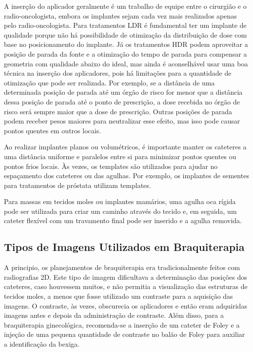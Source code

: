 \documentclass[11pt,a4paper]{article}
\newcounter{exemplo}
\begin{document}
	A inserção do aplicador geralmente é um trabalho de equipe entre o cirurgião e o radio-oncologista, embora os implantes sejam cada vez mais realizados apenas pelo radio-oncologista. Para tratamentos LDR é fundamental ter um implante de qualidade porque não há possibilidade de otimização da distribuição de dose com base no posicionamento do implante. Já os tratamentos HDR podem aproveitar a posição de parada da fonte e a otimização do tempo de parada para compensar a geometria com qualidade abaixo do ideal, mas ainda é aconselhável usar uma boa técnica na inserção dos aplicadores, pois há limitações para a quantidade de otimização que pode ser realizada. Por exemplo, se a distância de uma determinada posição de parada até um órgão de risco for menor que a distância dessa posição de parada até o ponto de prescrição, a dose recebida no órgão de risco será sempre maior que a dose de prescrição. Outras posições de parada podem receber pesos maiores para neutralizar esse efeito, mas isso pode causar pontos quentes em outros locais.
	
	Ao realizar implantes planos ou volumétricos, é importante manter os cateteres a uma distância uniforme e paralelos entre si para minimizar pontos quentes ou pontos frios locais. Às vezes, os templates são utilizados para ajudar no espaçamento dos cateteres ou das agulhas. Por exemplo, os implantes de sementes para tratamentos de próstata utilizam templates. 

	Para massas em tecidos moles ou implantes mamários, uma agulha oca rígida pode ser utilizada para criar um caminho através do tecido e, em seguida, um cateter flexível com um travamento final pode ser inserido e a agulha removida.

\subsection*{Tipos de Imagens Utilizados em Braquiterapia}

	A principio, os planejamentos de braquiterapia era tradicionalmente feitos com radiografias 2D. Este tipo de imagem dificultava a determinação das posições dos cateteres, caso houvessem muitos, e não permitia a visualização das estruturas de tecidos moles, a menos que fosse utilizado um contraste para a aquisição das imagens. O contraste, às vezes, obscurecia os aplicadores e então eram adquiridas imagens antes e depois da administração de contraste. Além disso, para a braquiterapia ginecológica, recomenda-se a inserção de um cateter de Foley e a injeção de uma pequena quantidade de contraste no balão de Foley para auxiliar a identificação da bexiga.
	
\end{document}
